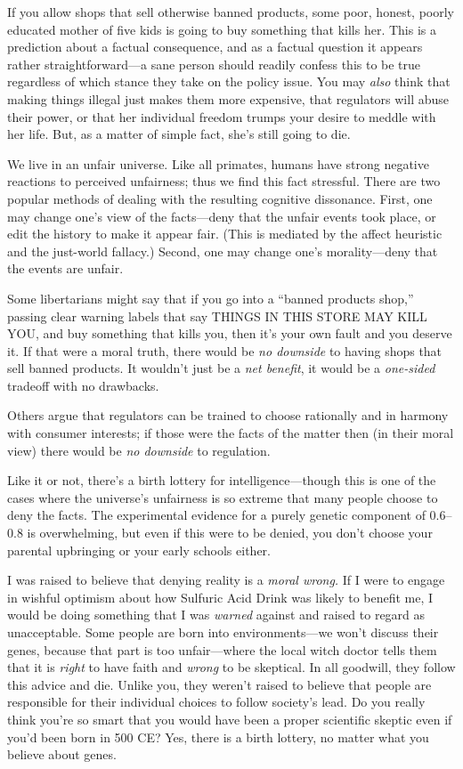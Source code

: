 {
 If you allow shops that sell otherwise banned products, some poor,
honest, poorly educated mother of five kids is going to buy something
that kills her. This is a prediction about a factual consequence, and
as a factual question it appears rather straightforward---a sane person
should readily confess this to be true regardless of which stance they
take on the policy issue. You may \textit{also} think that making
things illegal just makes them more expensive, that regulators will
abuse their power, or that her individual freedom trumps your desire to
meddle with her life. But, as a matter of simple fact,
she's still going to die.}

{
 We live in an unfair universe. Like all primates, humans have
strong negative reactions to perceived unfairness; thus we find this
fact stressful. There are two popular methods of dealing with the
resulting cognitive dissonance. First, one may change
one's view of the facts---deny that the unfair events
took place, or edit the history to make it appear fair. (This is
mediated by the affect heuristic and the just-world fallacy.) Second,
one may change one's morality---deny that the events
are unfair.}

{
 Some libertarians might say that if you go into a
``banned products shop,'' passing
clear warning labels that say THINGS IN THIS STORE MAY KILL YOU, and
buy something that kills you, then it's your own fault
and you deserve it. If that were a moral truth, there would be
\textit{no downside} to having shops that sell banned products. It
wouldn't just be a \textit{net benefit}, it would be a
\textit{one-sided} tradeoff with no drawbacks.}

{
 Others argue that regulators can be trained to choose rationally
and in harmony with consumer interests; if those were the facts of the
matter then (in their moral view) there would be \textit{no downside}
to regulation.}

{
 Like it or not, there's a birth lottery for
intelligence---though this is one of the cases where the
universe's unfairness is so extreme that many people
choose to deny the facts. The experimental evidence for a purely
genetic component of 0.6--0.8 is overwhelming, but even if this were to
be denied, you don't choose your parental upbringing or
your early schools either.}

{
 I was raised to believe that denying reality is a \textit{moral
wrong.} If I were to engage in wishful optimism about how Sulfuric Acid
Drink was likely to benefit me, I would be doing something that I was
\textit{warned} against and raised to regard as unacceptable. Some
people are born into environments---we won't discuss
their genes, because that part is too unfair---where the local witch
doctor tells them that it is \textit{right} to have faith and
\textit{wrong} to be skeptical. In all goodwill, they follow this
advice and die. Unlike you, they weren't raised to
believe that people are responsible for their individual choices to
follow society's lead. Do you really think
you're so smart that you would have been a proper
scientific skeptic even if you'd been born in 500 CE?
Yes, there is a birth lottery, no matter what you believe about genes.}

